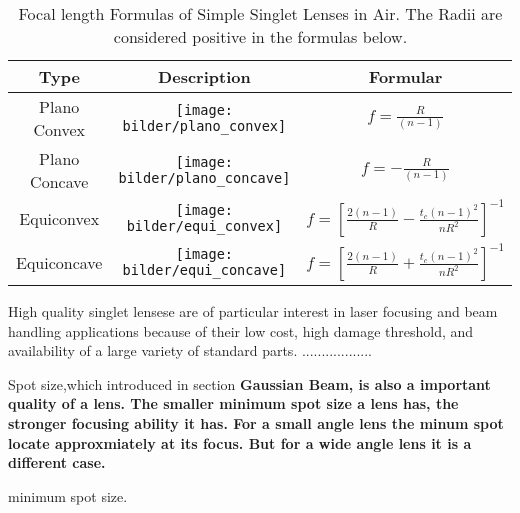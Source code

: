 \begin{table}
\begin{tabular}{|c|c|c|}
\hline
\textbf{Type}&\textbf{Description}&\textbf{Formular}\\
\hline
Plano Convex & \parbox[c]{2.1cm}{\texttt{[image: bilder/plano\_convex]}}& $f=\frac{R}{(n-1)}$ \\
\hline
Plano Concave &\parbox[c]{2.1cm}{\texttt{[image: bilder/plano\_concave]}} & $f=-\frac{R}{(n-1)}$ \\
\hline
Equiconvex & \parbox[c]{2.1cm}{\texttt{[image: bilder/equi\_convex]}} & $f=\left[\frac{2(n-1)}{R} - \frac{t_{c}(n-1)^2}{nR^2}\right]^{-1}$ \\
\hline
Equiconcave & \parbox[c]{2.1cm}{\texttt{[image: bilder/equi\_concave]}} & $f=\left[\frac{2(n-1)}{R} + \frac{t_{c}(n-1)^2}{nR^2}\right]^{-1}$ \\
\hline
\end{tabular}
\caption{Focal length Formulas of Simple Singlet Lenses in Air.  
				 The Radii are considered positive in the formulas below.}
\label{tab:lenses_focal_length}
\end{table}


High quality singlet lensese are of particular interest in laser focusing and beam handling applications because of their low cost, high damage threshold, and availability of a large variety of standard parts. ..................

Spot size,which introduced in section \bf{Gaussian Beam}, is also a important quality of a lens. The smaller minimum spot size a lens has, the stronger focusing ability it has.  For a small angle lens the minum spot locate approxmiately at its focus. But for a wide angle lens it is a different case.

minimum spot size.

	